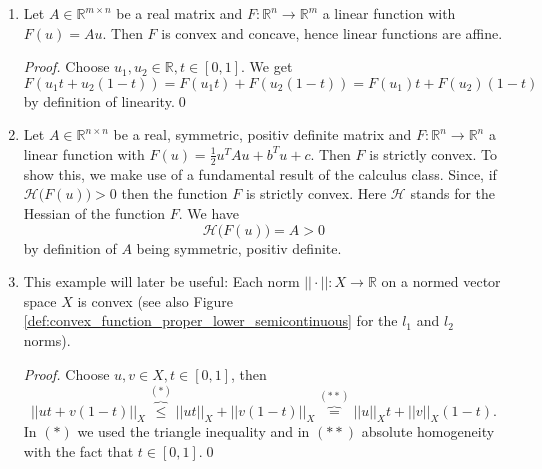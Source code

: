     \begin{example} %
    \label{ex:convex_function}

        \begin{enumerate}
            \item Let $A \in \mathbb{R}^{m \times n}$ be a real matrix and $F: \mathbb{R}^{n} \longrightarrow \mathbb{R}^{m}$ a linear function with $F(u) = Au$. Then $F$ is convex and concave, hence linear functions are affine.
                \begin{proof} %
                    Choose $u_{1}, u_{2} \in \mathbb{R}, t \in [0, 1]$. We get
                    $$
                       F(u_{1}t + u_{2}(1 - t)) = F(u_{1}t) + F(u_{2}(1 - t)) = F(u_{1})t + F(u_{2})(1 - t)
                    $$
                    by definition of linearity.\qed
                \end{proof}
            \item Let $A \in \mathbb{R}^{n \times n}$ be a real, symmetric, positiv definite matrix and $F: \mathbb{R}^{n} \longrightarrow \mathbb{R}^{n}$ a linear function with $F(u) = \frac{1}{2}u^{T}Au + b^{T}u + c$. Then $F$ is strictly convex. To show this, we make use of a fundamental result of the calculus class. Since, if $\mathcal{H}\big(F(u)\big) > 0$ then the function $F$ is strictly convex. Here $\mathcal{H}$ stands for the Hessian of the function $F$. We have
                $$
                    \mathcal{H}\big(F(u)\big) = A > 0
                $$
            by definition of $A$ being symmetric, positiv definite.
            \item This example will later be useful: Each norm $||\cdot||: X \longrightarrow \mathbb{R}$ on a normed vector space $X$ is convex (see also Figure \ref{def:convex_function_proper_lower_semicontinuous} for the $l_{1}$ and $l_{2}$ norms).
                \begin{proof} %
                    Choose $u, v \in X, t \in [0, 1]$, then
                    $$
                        ||ut + v(1 - t)||_{X} \overbrace{\le}^{(\ast)} ||ut||_{X} + ||v(1 - t)||_{X} \overbrace{=}^{(\ast\ast)} ||u||_{X} t + ||v||_{X} (1 - t).
                    $$
                    In $(\ast)$ we used the triangle inequality and in $(\ast\ast)$ absolute homogeneity with the fact that $t \in [0, 1]$.\qed
                \end{proof}
        \end{enumerate}

    \end{example}


